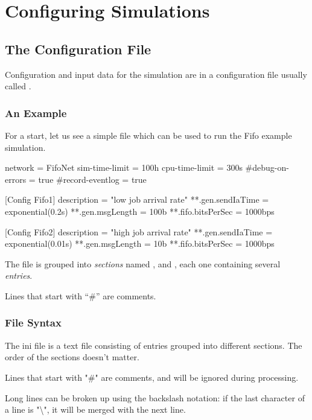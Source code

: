 \chapter{Configuring Simulations}
\label{cha:config-sim}

\section{The Configuration File}

Configuration and input data for the simulation are in
a configuration file usually called .

\subsection{An Example}

For a start, let us see a simple  file which
can be used to run the Fifo example simulation.

\begin{inifile}
[General]
network = FifoNet
sim-time-limit = 100h
cpu-time-limit = 300s
#debug-on-errors = true
#record-eventlog = true

[Config Fifo1]
description = "low job arrival rate"
**.gen.sendIaTime = exponential(0.2s)
**.gen.msgLength = 100b
**.fifo.bitsPerSec = 1000bps

[Config Fifo2]
description = "high job arrival rate"
**.gen.sendIaTime = exponential(0.01s)
**.gen.msgLength = 10b
**.fifo.bitsPerSec = 1000bps
\end{inifile}

The file is grouped into \textit{sections} named \ttt{[General]}, 
and , each one containing several \textit{entries}.

Lines that start with ``\#'' are comments.


\subsection{File Syntax}

The ini file is a text file consisting of entries grouped into different sections.
The order of the sections doesn't matter.

Lines that start with "\#" are comments, and will be ignored during processing.

Long lines can be broken up using the backslash notation: if the last character
of a line is "\textbackslash", it will be merged with the next line.

